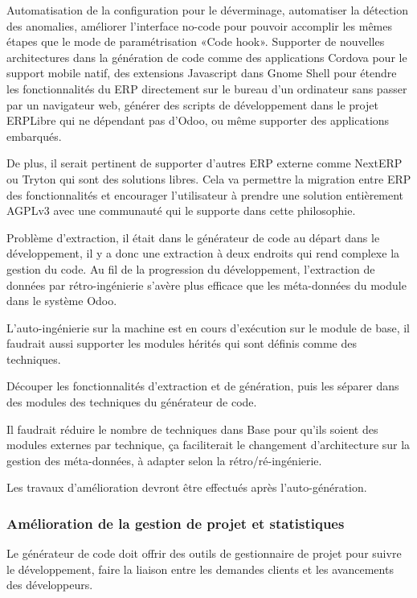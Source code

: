 Automatisation de la configuration pour le déverminage, automatiser la détection des anomalies, améliorer l’interface no-code pour pouvoir accomplir les mêmes étapes que le mode de paramétrisation «Code hook». Supporter de nouvelles architectures dans la génération de code comme des applications Cordova pour le support mobile natif, des extensions Javascript dans Gnome Shell pour étendre les fonctionnalités du ERP directement sur le bureau d’un ordinateur sans passer par un navigateur web, générer des scripts de développement dans le projet ERPLibre qui ne dépendant pas d’Odoo, ou même supporter des applications embarqués.

De plus, il serait pertinent de supporter d’autres ERP externe comme NextERP ou Tryton qui sont des solutions libres. Cela va permettre la migration entre ERP des fonctionnalités et encourager l’utilisateur à prendre une solution entièrement AGPLv3 avec une communauté qui le supporte dans cette philosophie.

Problème d’extraction, il était dans le générateur de code au départ dans le développement, il y a donc une extraction à deux endroits qui rend complexe la gestion du code. Au fil de la progression du développement, l’extraction de données par rétro-ingénierie s’avère plus efficace que les méta-données du module dans le système Odoo.

L’auto-ingénierie sur la machine est en cours d’exécution sur le module de base, il faudrait aussi supporter les modules hérités qui sont définis comme des techniques.

Découper les fonctionnalités d'extraction et de génération, puis les séparer dans des modules des techniques du générateur de code.

Il faudrait réduire le nombre de techniques dans Base pour qu’ils soient des modules externes par technique, ça faciliterait le changement d’architecture sur la gestion des méta-données, à adapter selon la rétro/ré-ingénierie.


Les travaux d’amélioration devront être effectués après l’auto-génération.

\subsubsection{Amélioration de la gestion de projet et statistiques}
Le générateur de code doit offrir des outils de gestionnaire de projet pour suivre le développement, faire la liaison entre les demandes clients et les avancements des développeurs.

